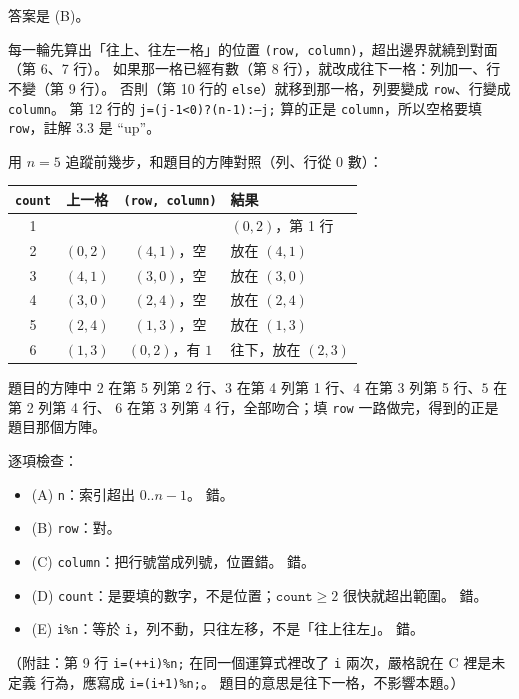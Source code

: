 \begin{pastsoln}
答案是 (B)。

每一輪先算出「往上、往左一格」的位置 \texttt{(row, column)}，超出邊界就繞到對面（第 6、7 行）。
如果那一格已經有數（第 8 行），就改成往下一格：列加一、行不變（第 9 行）。 否則（第 10 行的
\texttt{else}）就移到那一格，列要變成 \texttt{row}、行變成 \texttt{column}。 第 12 行的
\texttt{j=(j-1<0)?(n-1):--j;} 算的正是 \texttt{column}，所以空格要填 \texttt{row}，註解 3.3 是
``up''。

用 $n = 5$ 追蹤前幾步，和題目的方陣對照（列、行從 $0$ 數）：
\begin{center}
\begin{tabular}{cccl}
\toprule
\texttt{count} & 上一格 & \texttt{(row, column)} & 結果 \\
\midrule
1 & & & $(0, 2)$，第 1 行 \\
2 & $(0, 2)$ & $(4, 1)$，空 & 放在 $(4, 1)$ \\
3 & $(4, 1)$ & $(3, 0)$，空 & 放在 $(3, 0)$ \\
4 & $(3, 0)$ & $(2, 4)$，空 & 放在 $(2, 4)$ \\
5 & $(2, 4)$ & $(1, 3)$，空 & 放在 $(1, 3)$ \\
6 & $(1, 3)$ & $(0, 2)$，有 $1$ & 往下，放在 $(2, 3)$ \\
\bottomrule
\end{tabular}
\end{center}
題目的方陣中 $2$ 在第 5 列第 2 行、$3$ 在第 4 列第 1 行、$4$ 在第 3 列第 5 行、$5$ 在第 2 列第 4 行、
$6$ 在第 3 列第 4 行，全部吻合；填 \texttt{row} 一路做完，得到的正是題目那個方陣。

逐項檢查：
\begin{itemize}
\item (A) \texttt{n}：索引超出 $0..n-1$。 錯。
\item (B) \texttt{row}：對。
\item (C) \texttt{column}：把行號當成列號，位置錯。 錯。
\item (D) \texttt{count}：是要填的數字，不是位置；$\texttt{count} \ge 2$ 很快就超出範圍。 錯。
\item (E) \texttt{i\%n}：等於 \texttt{i}，列不動，只往左移，不是「往上往左」。 錯。
\end{itemize}
（附註：第 9 行 \texttt{i=(++i)\%n;} 在同一個運算式裡改了 \texttt{i} 兩次，嚴格說在 C 裡是未定義
行為，應寫成 \texttt{i=(i+1)\%n;}。 題目的意思是往下一格，不影響本題。）
\end{pastsoln}
